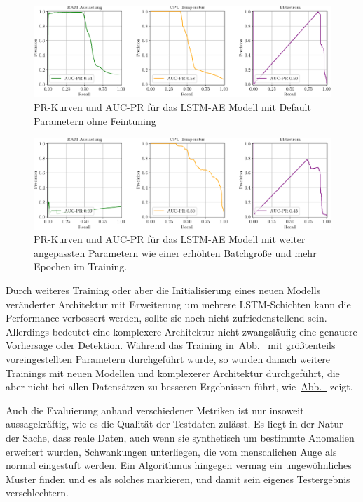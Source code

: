 \begin{figure}[H]
    \centering
        \includegraphics[width=1\linewidth]{ch5_anomalieerkennung/abbildungen/LSTMAE_PR_AUC_PR_1.pdf}
    \caption{\centering PR-Kurven und AUC-PR für das LSTM-AE Modell mit Default Parametern ohne Feintuning}
    \label{fig:LSTMAE_AUC_PR_1}
\end{figure}

\begin{figure}[b!]
    \centering
        \includegraphics[width=1\linewidth]{ch5_anomalieerkennung/abbildungen/LSTMAE_PR_AUC_PR_2.pdf}
    \caption{\centering PR-Kurven und AUC-PR für das LSTM-AE Modell mit weiter angepassten Parametern wie einer erhöhten Batchgröße und mehr Epochen
    im Training.}
    \label{fig:LSTMAE_AUC_PR_2}
\end{figure}

Durch weiteres Training oder aber die Initialisierung eines neuen Modells veränderter Architektur mit Erweiterung um mehrere LSTM-Schichten
kann die Performance verbessert werden, sollte sie noch nicht zufriedenstellend sein. Allerdings bedeutet eine komplexere Architektur nicht zwangsläufig
eine genauere Vorhersage oder Detektion. Während das Training in~\hyperref[fig:LSTMAE_AUC_PR_1]{Abb.~} mit größtenteils
voreingestellten Parametern durchgeführt wurde, so wurden danach weitere Trainings mit neuen Modellen und komplexerer Architektur durchgeführt,
die aber nicht bei allen Datensätzen zu besseren Ergebnissen führt, wie~\hyperref[fig:LSTMAE_AUC_PR_2]{Abb.~} zeigt.

Auch die Evaluierung anhand verschiedener Metriken ist nur insoweit aussagekräftig, wie es die Qualität der Testdaten zulässt. Es liegt in der Natur
der Sache, dass reale Daten, auch wenn sie synthetisch um bestimmte Anomalien erweitert wurden, Schwankungen unterliegen, die vom menschlichen Auge
als normal eingestuft werden. Ein Algorithmus hingegen vermag ein ungewöhnliches Muster finden und es als solches markieren, und damit sein eigenes
Testergebnis verschlechtern.

